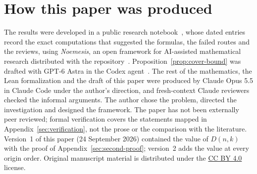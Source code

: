 \section*{How this paper was produced}\label{sec:model-assistance}

The results were developed in a public research notebook~\cite{Notebook}, whose
dated entries record the exact computations that suggested the formulas, the
failed routes and the reviews, using \emph{Noemesis}, an open framework for
AI-assisted mathematical research distributed with the repository~\cite{Repo}.
Proposition~\ref{prop:cover-bound} was drafted with GPT-6 Astra in the Codex
agent~\cite{Note}. The rest of the mathematics, the Lean formalization and the
draft of this paper were produced by Claude Opus 5.5 in Claude Code under the
author's direction, and fresh-context Claude reviewers checked the informal
arguments. The author chose the problem, directed the investigation and designed
the framework. The paper has not been externally peer reviewed; formal
verification covers the statements mapped in Appendix~\ref{sec:verification}, not
the prose or the comparison with the literature. Version~1 of this paper
(24 September 2026) contained the value of \(D(n,k)\) with the proof of
Appendix~\ref{sec:second-proof}; version~2 adds the value at every origin order.
Original manuscript material is distributed under the
\href{https://creativecommons.org/licenses/by/4.0/}{CC BY 4.0} license.
